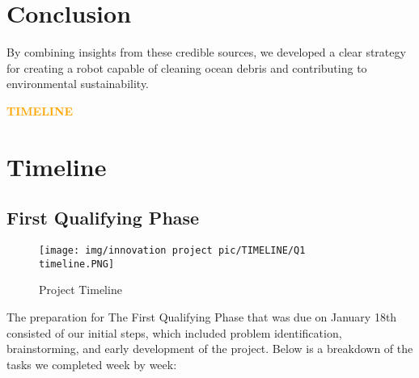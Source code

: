 \vspace{0.5cm}

\section{Conclusion}

By combining insights from these credible sources, we developed a clear strategy for creating a robot capable of cleaning ocean debris and contributing to environmental sustainability.
\newpage

\begin{center}
    \huge \textbf{\textcolor{orange}{TIMELINE}} \\[0.5cm]
\end{center}
\section{Timeline}
\subsection{First Qualifying Phase}

\begin{figure}[ht]
    \centering
    \texttt{[image: img/innovation project pic/TIMELINE/Q1 timeline.PNG]}  %
    \caption{Project Timeline}
    \label{fig: timeline Q1}
\end{figure}

The preparation for The First Qualifying Phase that was due on January 18th consisted of our initial steps, which included problem identification, brainstorming, and early development of the project. 
Below is a breakdown of the tasks we completed week by week:

